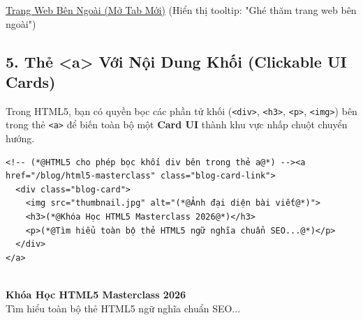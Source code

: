 \documentclass[11pt,oneside]{book}
\newcommand{\codeinline}[1]{\textcolor{accentOrange}{\texttt{#1}}}
\begin{document}
\begin{browserWindow}
\sffamily\small
\textcolor{primaryBlue}{\underline{Trang Web Bên Ngoài (Mở Tab Mới)}} \;\; \textcolor{gray!70}{\small(Hiển thị tooltip: "Ghé thăm trang web bên ngoài")}
\end{browserWindow}

\subsection{5. Thẻ <a> Với Nội Dung Khối (Clickable UI Cards)}
Trong HTML5, bạn có quyền bọc các phần tử khối (\codeinline{<div>}, \codeinline{<h3>}, \codeinline{<p>}, \codeinline{<img>}) bên trong thẻ \codeinline{<a>} để biến toàn bộ một \textbf{Card UI} thành khu vực nhấp chuột chuyển hướng.

\begin{codeWindow}
\begin{lstlisting}[language=HTML5]
<!-- (*@HTML5 cho phép bọc khối div bên trong thẻ a@*) --><a href="/blog/html5-masterclass" class="blog-card-link">
  <div class="blog-card">
    <img src="thumbnail.jpg" alt="(*@Ảnh đại diện bài viết@*)">
    <h3>(*@Khóa Học HTML5 Masterclass 2026@*)</h3>
    <p>(*@Tìm hiểu toàn bộ thẻ HTML5 ngữ nghĩa chuẩn SEO...@*)</p>
  </div>
</a>
\end{lstlisting}
\end{codeWindow}

\begin{browserWindow}
\sffamily\small
\begin{tcolorbox}[colback=white, colframe=primaryBlue!30, arc=6pt, drop shadow=black!6!white]
 \\[4pt]
{\bfseries\color{primaryBlue} Khóa Học HTML5 Masterclass 2026}\\[2pt]
{\small Tìm hiểu toàn bộ thẻ HTML5 ngữ nghĩa chuẩn SEO...}
\end{tcolorbox}
\end{browserWindow}
\end{document}
